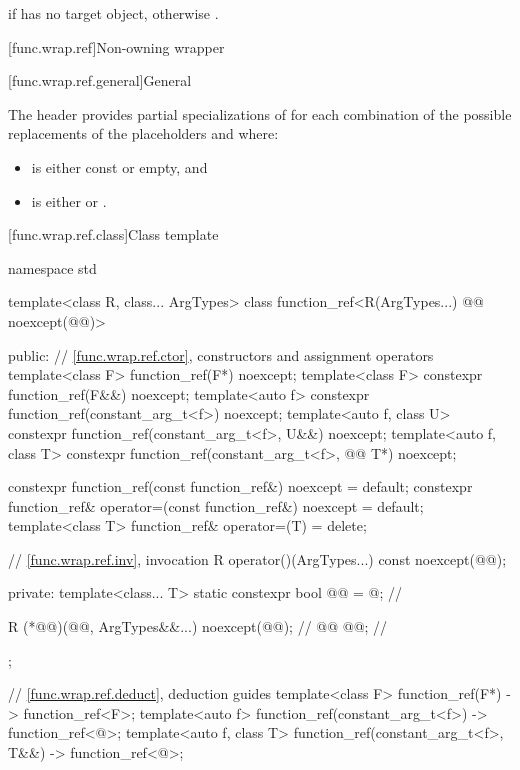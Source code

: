 \begin{itemdescr}
\pnum
\returns
{} if  has no target object, otherwise .
\end{itemdescr}

[func.wrap.ref]{Non-owning wrapper}

[func.wrap.ref.general]{General}

\pnum
The header provides partial specializations of 
for each combination of the possible replacements of
the placeholders \cv{} and  where:

\begin{itemize}
\item \cv{} is either const or empty, and
\item {} is either  or .
\end{itemize}

[func.wrap.ref.class]{Class template }

%
\begin{codeblock}
namespace std {
  template<class R, class... ArgTypes>
  class function_ref<R(ArgTypes...) @\cv{}@ noexcept(@@)> {
  public:
    // \ref{func.wrap.ref.ctor}, constructors and assignment operators
    template<class F> function_ref(F*) noexcept;
    template<class F> constexpr function_ref(F&&) noexcept;
    template<auto f> constexpr function_ref(constant_arg_t<f>) noexcept;
    template<auto f, class U> constexpr function_ref(constant_arg_t<f>, U&&) noexcept;
    template<auto f, class T> constexpr function_ref(constant_arg_t<f>, @\cv{}@ T*) noexcept;

    constexpr function_ref(const function_ref&) noexcept = default;
    constexpr function_ref& operator=(const function_ref&) noexcept = default;
    template<class T> function_ref& operator=(T) = delete;

    // \ref{func.wrap.ref.inv}, invocation
    R operator()(ArgTypes...) const noexcept(@@);

  private:
    template<class... T>
      static constexpr bool @@ = @\seebelownc@;             // \expos

    R (*@@)(@@, ArgTypes&&...) noexcept(@@);      // \expos
    @@ @@;                                       // \expos
  };

  // \ref{func.wrap.ref.deduct}, deduction guides
  template<class F>
    function_ref(F*) -> function_ref<F>;
  template<auto f>
    function_ref(constant_arg_t<f>) -> function_ref<@\seebelow@>;
  template<auto f, class T>
    function_ref(constant_arg_t<f>, T&&) -> function_ref<@\seebelow@>;
}
\end{codeblock}

